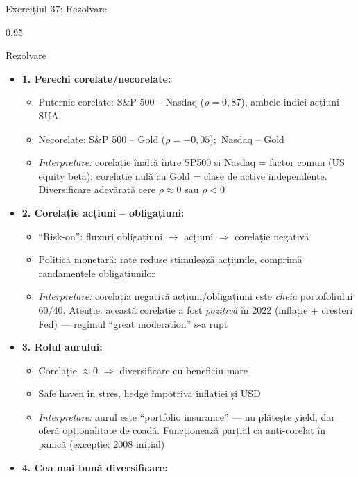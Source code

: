\documentclass[9pt, aspectratio=169, t]{beamer}
\begin{document}
\begin{frame}[shrink=40]{Exercițiul 37: Rezolvare}
\begin{cminipage}{0.95\textwidth}
\begin{exampleblock}{Rezolvare}
\begin{itemize}\setlength{\itemsep}{0pt}
    \item \textbf{1. Perechi corelate/necorelate:}
    \begin{itemize}\setlength{\itemsep}{0pt}
        \item Puternic corelate: S\&P 500 -- Nasdaq ($\rho = 0{,}87$), ambele indici acțiuni SUA
        \item Necorelate: S\&P 500 -- Gold ($\rho = -0{,}05$);\ Nasdaq -- Gold
        \item \textit{Interpretare:} corelație înaltă între SP500 și Nasdaq = factor comun (US equity beta); corelație nulă cu Gold = clase de active independente. Diversificare adevărată cere $\rho \approx 0$ sau $\rho < 0$
    \end{itemize}
    \item \textbf{2. Corelație acțiuni -- obligațiuni:}
    \begin{itemize}\setlength{\itemsep}{0pt}
        \item ``Risk-on'': fluxuri obligațiuni $\to$ acțiuni $\Rightarrow$ corelație negativă
        \item Politica monetară: rate reduse stimulează acțiunile, comprimă randamentele obligațiunilor
        \item \textit{Interpretare:} corelația negativă acțiuni/obligațiuni este \emph{cheia} portofoliului 60/40. Atenție: această corelație a fost \emph{pozitivă} în 2022 (inflație + creșteri Fed) --- regimul ``great moderation'' s-a rupt
    \end{itemize}
    \item \textbf{3. Rolul aurului:}
    \begin{itemize}\setlength{\itemsep}{0pt}
        \item Corelație $\approx 0$ $\Rightarrow$ diversificare cu beneficiu mare
        \item Safe haven în stres, hedge împotriva inflației și USD
        \item \textit{Interpretare:} aurul este ``portfolio insurance'' --- nu plătește yield, dar oferă opționalitate de coadă. Funcționează parțial ca anti-corelat în panică (excepție: 2008 inițial)
    \end{itemize}
    \item \textbf{4. Cea mai bună diversificare:}

\end{itemize}
\end{exampleblock}
\end{cminipage}
\end{frame}
\end{document}

